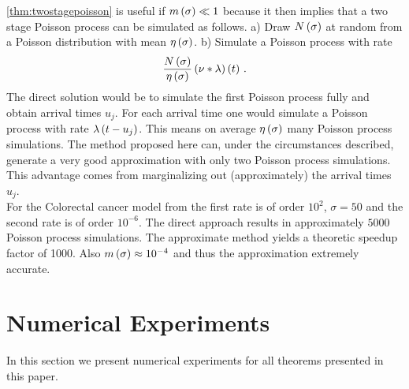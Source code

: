 \documentclass{amsart}
\numberwithin{equation}{section}
\begin{document}
\begin{remark}
\autoref{thm:twostagepoisson} is useful if $m\left(\sigma\right) \ll 1$ because it then implies that a two stage Poisson process can be simulated as follows. a) Draw $N\left(\sigma\right)$ at random from a Poisson distribution with mean $\eta\left(\sigma\right)$. b) Simulate a Poisson process with rate
\[
\frac{N\left(\sigma\right)}{\eta\left(\sigma\right)} \left(\nu \ast \lambda\right)\left(t\right) \, .
\]
The direct solution would be to simulate the first Poisson process fully and obtain arrival times $u_j$. For each arrival time one would simulate a Poisson process with rate $\lambda\left(t-u_j\right)$. This means on average $\eta\left(\sigma\right)$ many Poisson process simulations. The method proposed here can, under the circumstances described, generate a very good approximation with only two Poisson process simulations. This advantage comes from marginalizing out (approximately) the arrival times $u_j$.\\

\noindent For the Colorectal cancer model from \cite{jeon2008evaluation} the first rate is of order $10^2$, $\sigma=50$ and the second rate is of order $10^{-6}$. The direct approach results in approximately $5000$ Poisson process simulations. The approximate method yields a theoretic speedup factor of 1000. Also $m\left(\sigma\right) \approx 10^{-4}$ and thus the approximation extremely accurate.
\end{remark}


\newpage
\section{Numerical Experiments}
In this section we present numerical experiments for all theorems presented in this paper.
\end{document}
